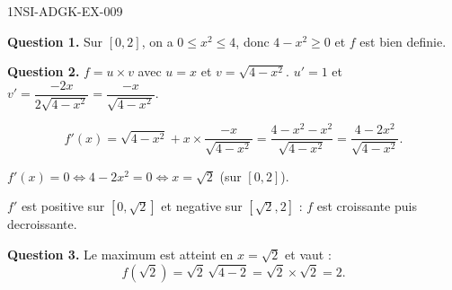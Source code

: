 \begin{corrige}{1NSI-ADGK-EX-009}

\textbf{Question 1.} Sur $[0,2]$, on a $0 \leq x^2 \leq 4$, donc $4 - x^2 \geq 0$ et $f$ est bien definie.


\textbf{Question 2.} $f = u \times v$ avec $u=x$ et $v=\sqrt{4-x^2}$.
$u'=1$ et $v' = \dfrac{-2x}{2\sqrt{4-x^2}} = \dfrac{-x}{\sqrt{4-x^2}}$.

\[ f'(x) = \sqrt{4-x^2} + x \times \frac{-x}{\sqrt{4-x^2}} = \frac{4-x^2-x^2}{\sqrt{4-x^2}} = \frac{4-2x^2}{\sqrt{4-x^2}}. \]

$f'(x) = 0 \iff 4-2x^2 = 0 \iff x = \sqrt{2}$ (sur $[0,2]$).

$f'$ est positive sur $[0,\sqrt{2}]$ et negative sur $[\sqrt{2}, 2]$ : $f$ est croissante puis decroissante.

\textbf{Question 3.} Le maximum est atteint en $x = \sqrt{2}$ et vaut :
\[ f(\sqrt{2}) = \sqrt{2}\,\sqrt{4-2} = \sqrt{2} \times \sqrt{2} = \boxed{2}. \]

\end{corrige}
